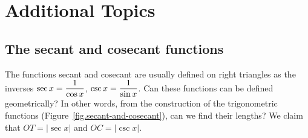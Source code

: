 
\chapter{Additional Topics}



\section{The secant and cosecant functions}

The functions secant and cosecant are usually defined on right triangles as the inverses $\sec x = \displaystyle\frac{1}{\cos x}$, $\csc x = \displaystyle\frac{1}{\sin x}$.
Can these functions can be defined geometrically?
In other words, from the construction of the trigonometric functions (Figure~\ref{fig.secant-and-cosecant}), can we find their lengths?
We claim that $OT=|\sec x|$ and $OC=|\csc x|$. 

